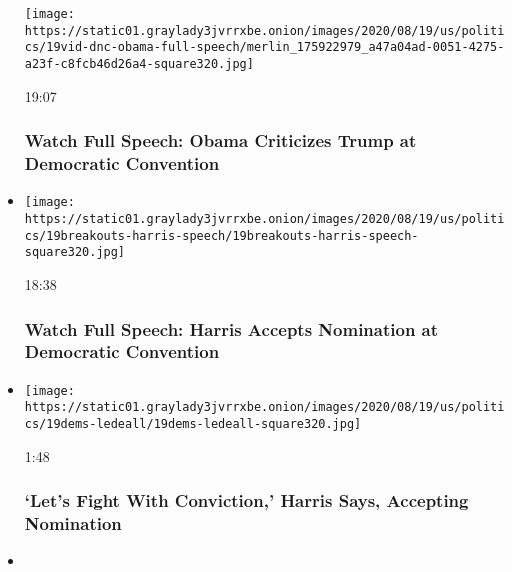 \begin{itemize}
  \texttt{[image: https://static01.graylady3jvrrxbe.onion/images/2020/08/19/us/politics/19vid-dnc-obama-full-speech/merlin\_175922979\_a47a04ad-0051-4275-a23f-c8fcb46d26a4-square320.jpg]}

  19:07

  \hypertarget{watch-full-speech-obama-criticizes-trump-at-democratic-convention}{%
  \subsubsection{Watch Full Speech: Obama Criticizes Trump at Democratic
  Convention}\label{watch-full-speech-obama-criticizes-trump-at-democratic-convention}}
\item
  \href{https://www.nytimes3xbfgragh.onion/video/us/elections/100000007297654/kamala-harris-full-speech-dnc.html?action=click\&module=video-series-bar\&region=header\&pgtype=Article\&playlistId=video/2020-Elections}{}

  \texttt{[image: https://static01.graylady3jvrrxbe.onion/images/2020/08/19/us/politics/19breakouts-harris-speech/19breakouts-harris-speech-square320.jpg]}

  18:38

  \hypertarget{watch-full-speech-harris-accepts-nomination-at-democratic-convention}{%
  \subsubsection{Watch Full Speech: Harris Accepts Nomination at
  Democratic
  Convention}\label{watch-full-speech-harris-accepts-nomination-at-democratic-convention}}
\item
  \href{https://www.nytimes3xbfgragh.onion/video/us/elections/100000007297621/kamala-harris-speaks-dnc.html?action=click\&module=video-series-bar\&region=header\&pgtype=Article\&playlistId=video/2020-Elections}{}

  \texttt{[image: https://static01.graylady3jvrrxbe.onion/images/2020/08/19/us/politics/19dems-ledeall/19dems-ledeall-square320.jpg]}

  1:48

  \hypertarget{lets-fight-with-conviction-harris-says-accepting-nomination}{%
  \subsubsection{`Let's Fight With Conviction,' Harris Says, Accepting
  Nomination}\label{lets-fight-with-conviction-harris-says-accepting-nomination}}
\item
  \href{https://www.nytimes3xbfgragh.onion/video/us/elections/100000007297589/barack-obama-speaks-dnc.html?action=click\&module=video-series-bar\&region=header\&pgtype=Article\&playlistId=video/2020-Elections}{}


\end{itemize}
